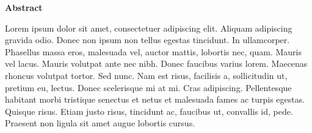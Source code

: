 \documentclass{tex/martin}
\begin{document}
\vspace{1 cm}

\begin{center}
\sffamily\textbf{Abstract} 
\end{center}
Lorem ipsum dolor sit amet, consectetuer adipiscing elit. Aliquam adipiscing gravida odio. Donec non ipsum non tellus egestas tincidunt. In ullamcorper. Phasellus massa eros, malesuada vel, auctor mattis, lobortis nec, quam. Mauris vel lacus. Mauris volutpat ante nec nibh. Donec faucibus varius lorem. Maecenas rhoncus volutpat tortor. Sed nunc. Nam est risus, facilisis a, sollicitudin ut, pretium eu, lectus. Donec scelerisque mi at mi. Cras adipiscing. Pellentesque habitant morbi tristique senectus et netus et malesuada fames ac turpis egestas. Quisque risus. Etiam justo risus, tincidunt ac, faucibus ut, convallis id, pede. Praesent non ligula sit amet augue lobortis cursus.


\setcounter{tocdepth}{3}   %

\cleardoublepage

\setcounter{page}{1}
\tableofcontents %

\listoffigures

\listoftables


\setlength{\parskip}{12pt}      %
\setlength{\parindent}{0pt}     %
\setlength{\mathindent}{24pt}
\cleardoublepage
{}
\setcounter{page}{1}     %
\pagestyle{plain}



\end{document}
